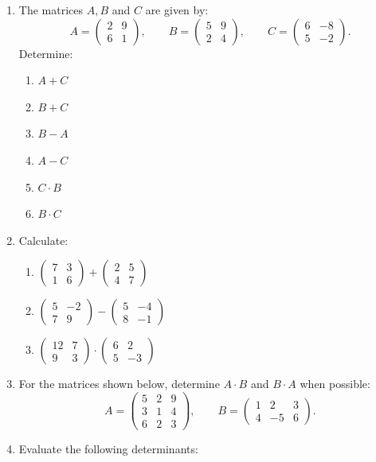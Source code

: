 \documentclass[
  12pt,
  oneside]{book}
\providecommand{\tightlist}{%
  \setlength{\itemsep}{0pt}\setlength{\parskip}{0pt}}
\theoremstyle{definition}
\theoremstyle{definition}
\theoremstyle{definition}
\theoremstyle{definition}
\theoremstyle{remark}
\begin{document}
\begin{enumerate}
\def\labelenumi{\arabic{enumi}.}
\item
  The matrices \(A,B\) and \(C\) are given by:
  \[A=\begin{pmatrix}2&9\\6&1\end{pmatrix},\qquad B=\begin{pmatrix}5&9\\2&4\end{pmatrix},\qquad C=\begin{pmatrix}6&-8\\5&-2\end{pmatrix}.\]
  Determine:

  \begin{enumerate}
  \def\labelenumii{\roman{enumii})}
  \tightlist
  \item
    \(A+C\)
  \item
    \(B+C\)
  \item
    \(B-A\)
  \item
    \(A-C\)
  \item
    \(C\cdot B\)
  \item
    \(B\cdot C\)
  \end{enumerate}
\item
  Calculate:

  \begin{enumerate}
  \def\labelenumii{\roman{enumii})}
  \tightlist
  \item
    \(\begin{pmatrix}7&3\\1&6\end{pmatrix}+\begin{pmatrix}2&5\\4&7\end{pmatrix}\)
  \item
    \(\begin{pmatrix}5&-2\\7&9\end{pmatrix}-\begin{pmatrix}5&-4\\8&-1\end{pmatrix}\)
  \item
    \(\begin{pmatrix}12&7\\9&3\end{pmatrix}\cdot \begin{pmatrix}6&2\\5&-3\end{pmatrix}\)
  \end{enumerate}
\item
  For the matrices shown below, determine \(A\cdot B\) and \(B\cdot A\) when possible:
  \[A=\begin{pmatrix}5&2&9\\3&1&4\\6&2&3\end{pmatrix},\qquad B=\begin{pmatrix}1&2&3\\4&-5&6\end{pmatrix}.\]
\item
  Evaluate the following determinants:


\end{enumerate}
\end{document}
